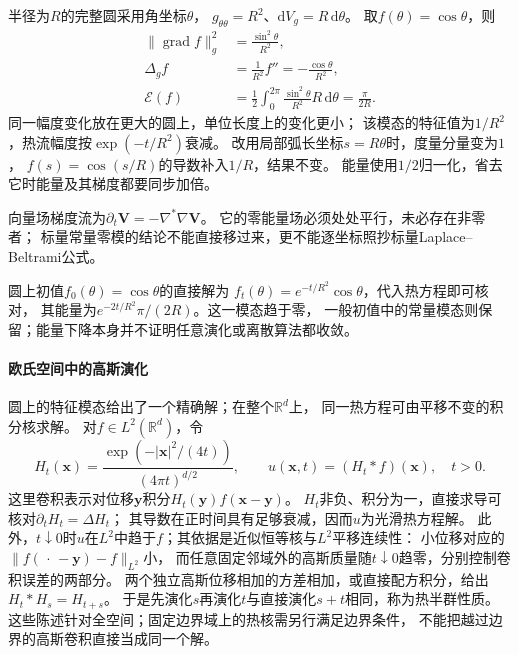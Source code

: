 \begin{example}
\label{ex:geometry-circle-energy-scale}
半径为$R$的完整圆采用角坐标$\theta$，
$g_{\theta\theta}=R^2$、$\mathrm dV_g=R\,\mathrm d\theta$。
取$f(\theta)=\cos\theta$，则
\[
 \begin{aligned}
 \lVert\operatorname{grad}f\rVert_g^2&=\frac{\sin^2\theta}{R^2},\\
 \Delta_gf&=\frac1{R^2}f''=-\frac{\cos\theta}{R^2},\\
 \mathcal E(f)&=\frac12\int_0^{2\pi}
        \frac{\sin^2\theta}{R^2}R\,\mathrm d\theta=\frac{\pi}{2R}.
 \end{aligned}
\]
同一幅度变化放在更大的圆上，单位长度上的变化更小；
该模态的特征值为$1/R^2$，热流幅度按$\exp(-t/R^2)$衰减。
改用局部弧长坐标$s=R\theta$时，度量分量变为$1$，
$f(s)=\cos(s/R)$的导数补入$1/R$，结果不变。
能量使用$1/2$归一化，省去它时能量及其梯度都要同步加倍。
\end{example}


向量场梯度流为$\partial_t\bm V=-\nabla^*\nabla\bm V$。
它的零能量场必须处处平行，未必存在非零者；
标量常量零模的结论不能直接移过来，更不能逐坐标照抄标量Laplace--Beltrami公式。


圆上初值$f_0(\theta)=\cos\theta$的直接解为
$f_t(\theta)=e^{-t/R^2}\cos\theta$，代入热方程即可核对，
其能量为$e^{-2t/R^2}\pi/(2R)$。这一模态趋于零，
一般初值中的常量模态则保留；能量下降本身并不证明任意演化或离散算法都收敛。

\paragraph{欧氏空间中的高斯演化}
圆上的特征模态给出了一个精确解；在整个$\mathbb R^d$上，
同一热方程可由平移不变的积分核求解。
对$f\in L^2(\mathbb R^d)$，令
\begin{equation}
 H_t(\bm x)=\frac{\exp(-|\bm x|^2/(4t))}{(4\pi t)^{d/2}},
 \qquad u(\bm x,t)=(H_t*f)(\bm x),\quad t>0.
 \label{eq:functional-euclidean-heat-kernel}
\end{equation}
这里卷积表示对位移$\bm y$积分$H_t(\bm y)f(\bm x-\bm y)$。
$H_t$非负、积分为一，直接求导可核对$\partial_tH_t=\Delta H_t$；
其导数在正时间具有足够衰减，因而$u$为光滑热方程解。
此外，$t\downarrow0$时$u$在$L^2$中趋于$f$；其依据是近似恒等核与$L^2$平移连续性：
小位移对应的$\|f(\,\cdot\,-\bm y)-f\|_{L^2}$小，
而任意固定邻域外的高斯质量随$t\downarrow0$趋零，分别控制卷积误差的两部分。
两个独立高斯位移相加的方差相加，或直接配方积分，给出
$H_t*H_s=H_{t+s}$。
于是先演化$s$再演化$t$与直接演化$s+t$相同，称为热半群性质。
这些陈述针对全空间；固定边界域上的热核需另行满足边界条件，
不能把越过边界的高斯卷积直接当成同一个解。


